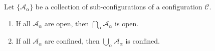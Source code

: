 Let $\{\mathcal{A}_\alpha\}$ be a collection of sub-configurations of a configuration $\mathcal{C}$.

\begin{enumerate}
  \item[(i)] If all $\mathcal{A}_\alpha$ are open, then $\bigcap_\alpha \mathcal{A}_\alpha$ is open.
  \item[(ii)] If all $\mathcal{A}_\alpha$ are confined, then $\bigcup_\alpha \mathcal{A}_\alpha$ is confined.
\end{enumerate}
